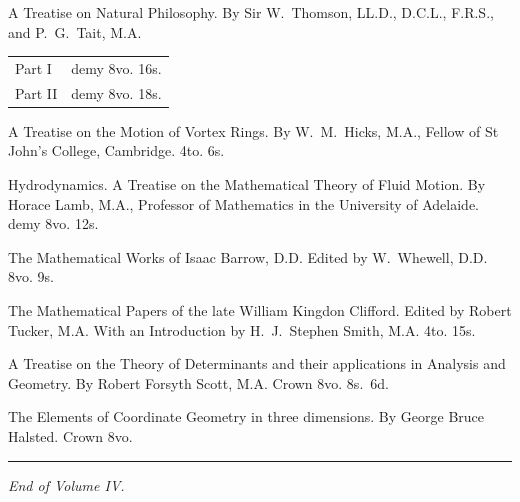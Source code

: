 \documentclass[12pt,a4paper]{article}
\theoremstyle{definition}
\begin{document}
\vspace{1em}

\noindent A Treatise on Natural Philosophy. By Sir W.~Thomson, LL.D., D.C.L., F.R.S., and P.~G.~Tait, M.A.

\begin{tabular}{ll}
Part I & demy 8vo. 16s.\\
Part II & demy 8vo. 18s.
\end{tabular}

\vspace{1em}

\noindent A Treatise on the Motion of Vortex Rings. By W.~M.~Hicks, M.A., Fellow of St John's College, Cambridge. 4to. 6s.

\vspace{0.5em}

\noindent Hydrodynamics. A Treatise on the Mathematical Theory of Fluid Motion. By Horace Lamb, M.A., Professor of Mathematics in the University of Adelaide. demy 8vo. 12s.

\vspace{0.5em}

\noindent The Mathematical Works of Isaac Barrow, D.D. Edited by W.~Whewell, D.D. 8vo. 9s.

\vspace{0.5em}

\noindent The Mathematical Papers of the late William Kingdon Clifford. Edited by Robert Tucker, M.A. With an Introduction by H.~J.~Stephen Smith, M.A. 4to. 15s.

\vspace{0.5em}

\noindent A Treatise on the Theory of Determinants and their applications in Analysis and Geometry. By Robert Forsyth Scott, M.A. Crown 8vo. 8s.~6d.

\vspace{0.5em}

\noindent The Elements of Coordinate Geometry in three dimensions. By George Bruce Halsted. Crown 8vo.

\vspace{2em}

\begin{center}
\rule{0.5\textwidth}{0.4pt}
\end{center}

\vspace{2em}

\begin{center}
\textit{End of Volume IV.}
\end{center}
\end{document}
